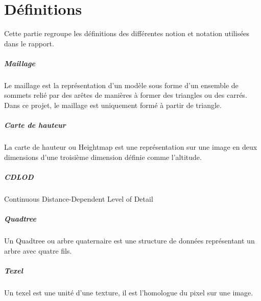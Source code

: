   \chapter*{Définitions}
    Cette partie regroupe les définitions des différentes notion et notation utilisées dans le rapport.
    
    
    \paragraph{Maillage} Le maillage est la représentation d'un modèle sous forme d'un ensemble de sommets relié par des arêtes de manières à former des triangles ou des carrés. Dans ce projet, le maillage est uniquement formé à partir de triangle.
    
    \paragraph{Carte de hauteur} La carte de hauteur ou Heightmap est une représentation sur une image en deux dimensions d'une troisième dimension définie comme l'altitude. 
    
    \paragraph{CDLOD} Continuous Distance-Dependent Level of Detail
    \paragraph{Quadtree} Un Quadtree ou arbre quaternaire est une structure de données représentant un arbre avec quatre fils.
    \paragraph{Texel} Un texel est une unité d'une texture, il est l'homologue du pixel sur une image.
